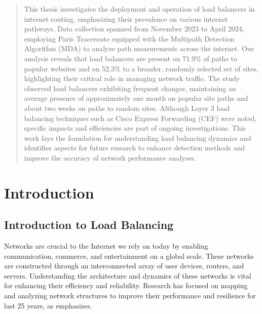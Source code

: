 \documentclass[12pt]{cwru_thesis}
\begin{document}
\printnomenclature

\begin{abstract}

This thesis investigates the deployment and operation of load balancers in internet routing, emphasizing their prevalence on various internet pathways. Data collection spanned from November 2023 to April 2024, employing Paris Traceroute equipped with the Multipath Detection Algorithm (MDA) to analyze path measurements across the internet. Our analysis reveals that load balancers are present on 71.9\% of paths to popular websites and on 52.3\% to a broader, randomly selected set of sites, highlighting their critical role in managing network traffic. The study observed load balancers exhibiting frequent changes, maintaining an average presence of approximately one month on popular site paths and about two weeks on paths to random sites. Although Layer 3 load balancing techniques such as Cisco Express Forwarding (CEF) were noted, specific impacts and efficiencies are part of ongoing investigations. This work lays the foundation for understanding load balancing dynamics and identifies aspects for future research to enhance detection methods and improve the accuracy of network performance analyses.

\end{abstract}



\mainmatter

\setcounter{secnumdepth}{2}

\chapter{Introduction} 
\label{chap:intro}

\section{Introduction to Load Balancing}

Networks are crucial to the Internet we rely on today by enabling communication, commerce, and entertainment on a global scale. These networks are constructed through an interconnected array of user devices, routers, and servers. Understanding the architecture and dynamics of these networks is vital for enhancing their efficiency and reliability. Research has focused on mapping and analyzing network structures to improve their performance and resilience for last 25 years, as \cite{paxson_endtoend96} emphasizes.
\end{document}
